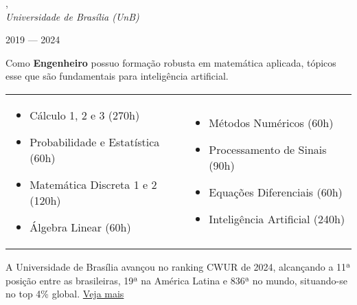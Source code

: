 , \\
\textit{Universidade de Brasília (UnB)}\strut \hfill 2019 --- 2024\\

\vspace*{7pt}

Como \textbf{Engenheiro} possuo formação robusta em matemática aplicada, tópicos esse que são fundamentais para inteligência artificial.

\vspace*{7pt}

\begin{tabular}{@{}ll@{}}
  \begin{minipage}[t]{0.45\textwidth}
    \begin{itemize}
      \item Cálculo 1, 2 e 3 (270h)
      \item Probabilidade e Estatística (60h)
      \item Matemática Discreta 1 e 2 (120h)
      \item Álgebra Linear (60h)
    \end{itemize}
  \end{minipage}
  &
  \begin{minipage}[t]{0.45\textwidth}
    \begin{itemize}
      \item Métodos Numéricos (60h)
      \item Processamento de Sinais (90h)
      \item Equações Diferenciais (60h)
      \item Inteligência Artificial (240h)
    \end{itemize}
  \end{minipage}
\end{tabular}

\vspace*{7pt}

A Universidade de Brasília avançou no ranking CWUR de 2024, alcançando a 11ª posição entre as brasileiras,
19ª na América Latina e 836ª no mundo, situando-se no top 4\% global. \href{https://cwur.org/2024/university-of-brasilia.php}{Veja mais}
